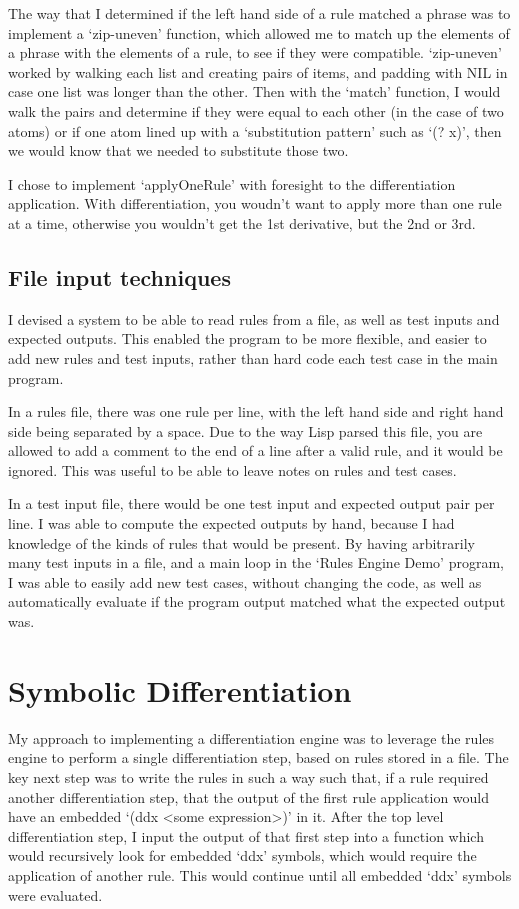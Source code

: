 \documentclass[letterpaper]{article}
\begin{document}
The way that I determined if the left hand side of a rule matched a phrase
was to implement a `zip-uneven' function, which allowed me to match up the
elements of a phrase with the elements of a rule, to see if they were compatible.
`zip-uneven' worked by walking each list and creating pairs of items, and padding
with NIL in case one list was longer than the other. Then with the `match' function,
I would walk the pairs and determine if they were equal to each other (in the case of 
two atoms) or if one atom lined up with a `substitution pattern' such as `(? x)', then
we would know that we needed to substitute those two.

I chose to implement `applyOneRule' with foresight to the differentiation application.
With differentiation, you woudn't want to apply more than one rule at a time, otherwise
you wouldn't get the 1st derivative, but the 2nd or 3rd.

\subsection{File input techniques}
I devised a system to be able to read rules from a file, as well as test
inputs and expected outputs. This enabled the program to be more flexible, and
easier to add new rules and test inputs, rather than hard code each test case
in the main program.

In a rules file, there was one rule per line, with the left hand side and right hand side
being separated by a space. Due to the way Lisp parsed this file, you are allowed to add a
comment to the end of a line after a valid rule, and it would be ignored. This was useful
to be able to leave notes on rules and test cases.

In a test input file, there would be one test input and expected output pair per line.
I was able to compute the expected outputs by hand, because I had knowledge of the kinds of
rules that would be present. By having arbitrarily many test inputs in a file, and a
main loop in the `Rules Engine Demo' program, I was able to easily add new test cases,
without changing the code, as well as automatically evaluate if the program output
matched what the expected output was.

\section{Symbolic Differentiation}

My approach to implementing a differentiation engine was to leverage the rules engine
to perform a single differentiation step, based on rules stored in a file. The key
next step was to write the rules in such a way such that, if a rule required
another differentiation step, that the output of the first rule application would have
an embedded `(ddx <some expression>)' in it. After the top level differentiation step,
I input the output of that first step into a function which would recursively look
for embedded `ddx' symbols, which would require the application of another rule.
This would continue until all embedded `ddx' symbols were evaluated.
\end{document}
